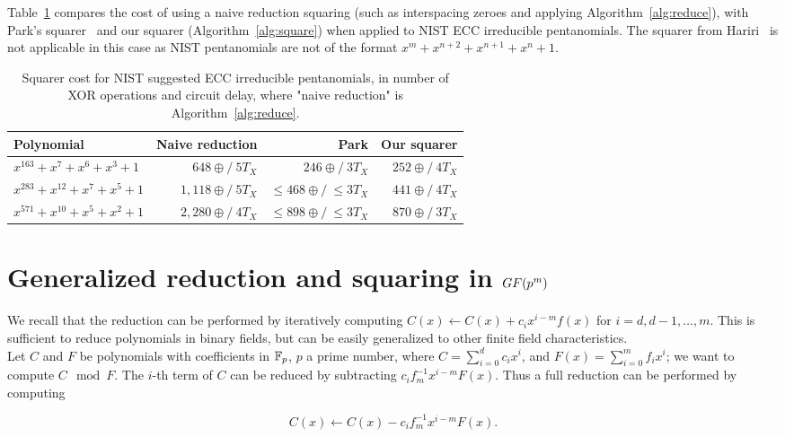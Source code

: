 Table~\ref{table:comparison_nist} compares the cost of using a naive reduction squaring (such as interspacing zeroes and applying Algorithm~\ref{alg:reduce}), with Park's squarer~\cite{park2012explicit} and our squarer (Algorithm~\ref{alg:square}) when applied to NIST ECC irreducible pentanomials. The squarer from Hariri~\cite{hariri2009bit} is not applicable in this case as NIST pentanomials are not of the format $x^m+x^{n+2}+x^{n+1}+x^{n}+1$.

\begin{table}
\centering
\smaller
\caption{Squarer cost for NIST suggested ECC irreducible pentanomials, in number of XOR operations and circuit delay, where "naive reduction" is Algorithm~\ref{alg:reduce}.}
{\begin{tabular}{l r r r} \label{table:comparison_nist}
Polynomial & Naive reduction & Park \cite{park2012explicit} & Our squarer \\ \hline
$x^{163} + x^7 + x^6 + x^3 + 1$ & $648\oplus/~5T_X$ & $246\oplus/~3T_X$ & $252\oplus/~4T_X$ \\ \hline
$x^{283} + x^{12} + x^7 + x^5 + 1$ & $1,118\oplus/~5T_X$ & $\leq468\oplus/~\leq3T_X$ & $441\oplus/~4T_X$ \\ \hline
$x^{571} + x^{10} + x^5 + x^2 + 1$ & $2,280\oplus/~4T_X$ & $\leq898\oplus/~\leq3T_X$ & $870\oplus/~3T_X$
\end{tabular}}{}
\end{table}

\section{Generalized reduction and squaring in $GF(\MakeLowercase{p}^\MakeLowercase{m})$}

We recall that the reduction can be performed by iteratively computing $C(x) \leftarrow C(x) + c_{i} x^{i-m} f(x)$ for $i = d, d-1, \ldots, m$. This is sufficient to reduce polynomials in binary fields, but can be easily generalized to other finite field characteristics. \\

Let $C$ and $F$ be polynomials with coefficients in $\mathbb{F}_p$, $p$ a prime number, where $C = \sum_{i=0}^d c_i x^i$, and $F(x) = \sum_{i=0}^m f_i x^i$; we want to compute $C \mod F$. The $i$-th term of $C$ can be reduced by subtracting $c_i f_m^{-1} x^{i-m} F(x)$. Thus a full reduction can be performed by computing

$$C(x) \leftarrow C(x) - c_i f_m^{-1} x^{i-m} F(x).$$

